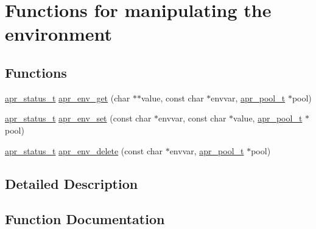 \hypertarget{group__apr__env}{}\section{Functions for manipulating the environment}
\label{group__apr__env}
\subsection*{Functions}
\begin{DoxyCompactItemize}
\item 
\hyperlink{group__apr__errno_gaf76ee4543247e9fb3f3546203e590a6c}{apr\+\_\+status\+\_\+t} \hyperlink{group__apr__env_gada7cd6ccada789a3738f8fc6334da809}{apr\+\_\+env\+\_\+get} (char $\ast$$\ast$value, const char $\ast$envvar, \hyperlink{group__apr__pools_gaf137f28edcf9a086cd6bc36c20d7cdfb}{apr\+\_\+pool\+\_\+t} $\ast$pool)
\item 
\hyperlink{group__apr__errno_gaf76ee4543247e9fb3f3546203e590a6c}{apr\+\_\+status\+\_\+t} \hyperlink{group__apr__env_gae11f733a639393a35e82c795f4ecd470}{apr\+\_\+env\+\_\+set} (const char $\ast$envvar, const char $\ast$value, \hyperlink{group__apr__pools_gaf137f28edcf9a086cd6bc36c20d7cdfb}{apr\+\_\+pool\+\_\+t} $\ast$pool)
\item 
\hyperlink{group__apr__errno_gaf76ee4543247e9fb3f3546203e590a6c}{apr\+\_\+status\+\_\+t} \hyperlink{group__apr__env_ga2bfac0686199b2fee97a7638df7cbfdc}{apr\+\_\+env\+\_\+delete} (const char $\ast$envvar, \hyperlink{group__apr__pools_gaf137f28edcf9a086cd6bc36c20d7cdfb}{apr\+\_\+pool\+\_\+t} $\ast$pool)
\end{DoxyCompactItemize}


\subsection{Detailed Description}


\subsection{Function Documentation}
